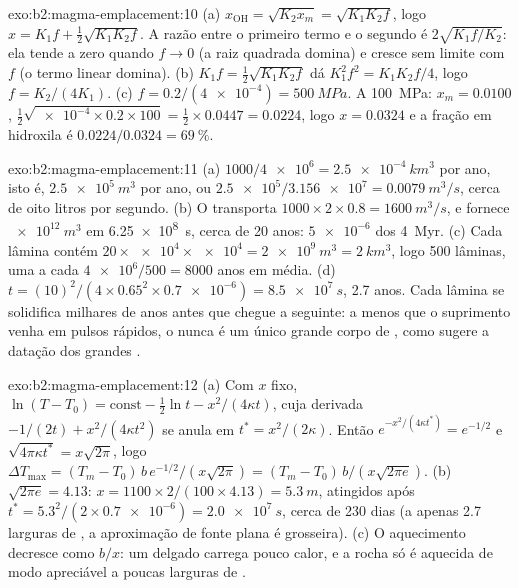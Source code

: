 \begin{solution}{exo:b2:magma-emplacement:10}
(a) $x_{\mathrm{OH}} = \sqrt{K_2x_m} = \sqrt{K_1K_2f}$, logo $x = K_1f + \frac12\sqrt{K_1K_2f}$.
A razão entre o primeiro termo e o segundo é $2\sqrt{K_1f/K_2}$: ela tende a zero
quando $f \to 0$ (a raiz quadrada domina) e cresce sem limite com $f$ (o
termo linear domina). (b) $K_1 f = \frac12\sqrt{K_1K_2 f}$ dá $K_1^2f^2 =
K_1K_2f/4$, logo $f = K_2/(4K_1)$. (c) $f = 0.2/(\num{4e-4}) = \qty{500}{MPa}$. A
\qty{100}{MPa}: $x_m = 0.0100$, $\frac12\sqrt{\num{e-4}\times0.2\times100} =
\frac12\times0.0447 = 0.0224$, logo $x = 0.0324$ e a fração em hidroxila é
$0.0224/0.0324 = \qty{69}{\percent}$.
\end{solution}

\begin{solution}{exo:b2:magma-emplacement:11}
(a) $1000/\num{4e6} = \qty{2.5e-4}{km^3}$ por ano, isto é, $\qty{2.5e5}{m^3}$ por ano,
ou $\num{2.5e5}/\num{3.156e7} = \qty{0.0079}{m^3/s}$, cerca de oito litros por segundo.
(b) O  transporta $1000\times2\times0.8 = \qty{1600}{m^3/s}$, e fornece
$\qty{e12}{m^3}$ em \qty{6.25e8}{s}, cerca de 20 anos: $\num{5e-6}$ dos
\qty{4}{Myr}. (c) Cada lâmina contém $20\times\num{e4}\times\num{e4} = \qty{2e9}{m^3} =
\qty{2}{km^3}$, logo 500 lâminas, uma a cada $\num{4e6}/500 = 8000$ anos em média.
(d) $t = (10)^2/(4\times0.65^2\times\num{0.7e-6}) = \qty{8.5e7}{s}$, 2.7 anos. Cada
lâmina se solidifica milhares de anos antes que chegue a seguinte: a menos que o suprimento
venha em pulsos rápidos, o  nunca é um único grande corpo de , como sugere a
datação dos grandes .
\end{solution}

\begin{solution}{exo:b2:magma-emplacement:12}
(a) Com $x$ fixo, $\ln(T - T_0) = \text{const} - \frac12\ln t - x^2/(4\kappa t)$, cuja
derivada $-1/(2t) + x^2/(4\kappa t^2)$ se anula em $t^* = x^2/(2\kappa)$. Então
$e^{-x^2/(4\kappa t^*)} = e^{-1/2}$ e $\sqrt{4\pi\kappa t^*} = x\sqrt{2\pi}$, logo $\Delta
T_{\max} = (T_m - T_0)\,b\,e^{-1/2}/(x\sqrt{2\pi}) = (T_m - T_0)\,b/(x\sqrt{2\pi e})$. (b)
$\sqrt{2\pi e} = 4.13$: $x = 1100\times2/(100\times4.13) = \qty{5.3}{m}$, atingidos após
$t^* = 5.3^2/(2\times\num{0.7e-6}) = \qty{2.0e7}{s}$, cerca de 230 dias (a apenas 2.7
larguras de , a aproximação de fonte plana é grosseira). (c) O aquecimento decresce
como $b/x$: um  delgado carrega pouco calor, e a rocha só é aquecida de modo apreciável
a poucas larguras de .
\end{solution}


